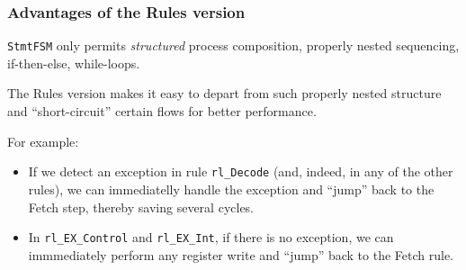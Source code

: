 
\begin{frame}[fragile]
\frametitle{Advantages of the Rules version}

\footnotesize

{\tt StmtFSM} only permits \emph{structured} process composition,
{\ie} properly nested sequencing, if-then-else, while-loops.

\vxxxx

The Rules version makes it easy to depart from such properly nested
structure and ``short-circuit'' certain flows for better performance.

\vxx

For example:
\begin{itemize}

  \item If we detect an exception in rule {\tt rl\_Decode} (and,
      indeed, in any of the other rules), we can immediatelly handle
      the exception and ``jump'' back to the Fetch step, thereby
      saving several cycles.

  \item In {\tt rl\_EX\_Control} and {\tt rl\_EX\_Int}, if there is no
      exception, we can immmediately perform any register write and
      ``jump'' back to the Fetch rule.

\end{itemize}

\end{frame}






